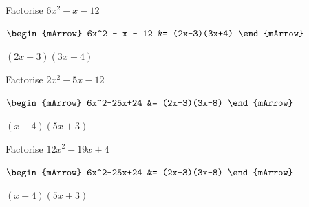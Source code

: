 \begin{mtask}
   \task \begin{exercise} Factorise $6x^2 - x - 12$\\
             \begin{envSolution}
			      
			      $\begin{mArrow}
			        6x^2 - x - 12  &= (2x-3)(3x+4)                       
				 \end{mArrow}$
                 \begin{shortsolution}  
				       $(2x-3)(3x+4) $
			     \end{shortsolution}				 
               \end{envSolution}
         \end{exercise}
		 		 
   \task \begin{exercise} Factorise $2x^2-5x-12$\\
             \begin{envSolution}
			      
			      $\begin{mArrow}
			        6x^2-25x+24  &= (2x-3)(3x-8)                       
				 \end{mArrow}$
                 \begin{shortsolution}  
				       $(x-4)(5x+3) $
			     \end{shortsolution}				 
               \end{envSolution}
         \end{exercise}

   \task \begin{exercise} Factorise $12x^2-19x+4$\\
             \begin{envSolution}
			      $\begin{mArrow}
			        6x^2-25x+24  &= (2x-3)(3x-8)                       
				 \end{mArrow}$
                 \begin{shortsolution}  
				       $(x-4)(5x+3) $
			     \end{shortsolution}				 
               \end{envSolution}
         \end{exercise}
\end{mtask}



